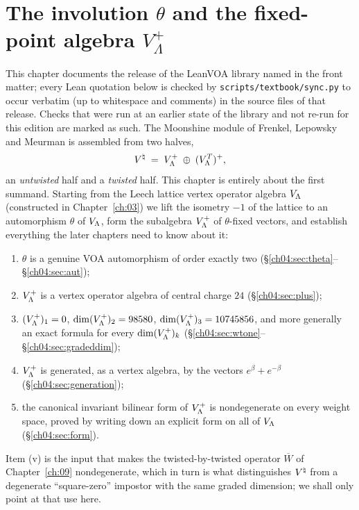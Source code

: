\chapter{The involution \texorpdfstring{$\theta$}{theta} and the fixed-point algebra \texorpdfstring{$V_\Lambda^+$}{V+}}\label{ch:04}

\providecommand{\chfourone}{\mathbf{1}}

This chapter documents the release of the LeanVOA library named in the front matter; every Lean quotation below is checked by \texttt{scripts/textbook/sync.py}
to occur verbatim (up to whitespace and comments) in the source files of that release. Checks
that were run at an earlier state of the library and not re-run for this edition are marked as such.
The Moonshine module of Frenkel, Lepowsky and Meurman is assembled from two halves,
\begin{equation*}
  {V^{\natural}} \;=\; V_{\Lambda}^{+}\;\oplus\;(V_{\Lambda}^{T})^{+},
\end{equation*}
an \emph{untwisted} half and a \emph{twisted} half. This chapter is entirely about the first
summand. Starting from the Leech lattice vertex operator algebra $V_{\Lambda}$ (constructed in
Chapter~\ref{ch:03}) we lift the isometry $-1$ of the lattice to an automorphism $\theta$ of
$V_{\Lambda}$, form the subalgebra $V_{\Lambda}^+$ of $\theta$-fixed vectors, and establish everything the
later chapters need to know about it:
\begin{enumerate}[label=(\roman*)]
\item $\theta$ is a genuine VOA automorphism of order exactly two
  (\S\ref{ch04:sec:theta}--\S\ref{ch04:sec:aut});
\item $V_{\Lambda}^+$ is a vertex operator algebra of central charge $24$ (\S\ref{ch04:sec:plus});
\item $(V_{\Lambda}^+)_1 = 0$, $\dim (V_{\Lambda}^+)_2 = 98580$, $\dim (V_{\Lambda}^+)_3 = 10745856$, and
  more generally an exact formula for every $\dim(V_{\Lambda}^+)_k$
  (\S\ref{ch04:sec:wtone}--\S\ref{ch04:sec:gradeddim});
\item $V_{\Lambda}^+$ is generated, as a vertex algebra, by the vectors $e^\beta+e^{-\beta}$
  (\S\ref{ch04:sec:generation});
\item the canonical invariant bilinear form of $V_{\Lambda}^+$ is nondegenerate on every weight space,
  proved by writing down an explicit form on all of $V_{\Lambda}$ (\S\ref{ch04:sec:form}).
\end{enumerate}
Item (v) is the input that makes the twisted-by-twisted operator $\overline W$ of
Chapter~\ref{ch:09} nondegenerate, which in turn is what distinguishes ${V^{\natural}}$ from a degenerate
``square-zero'' impostor with the same graded dimension; we shall only point at that use here.

